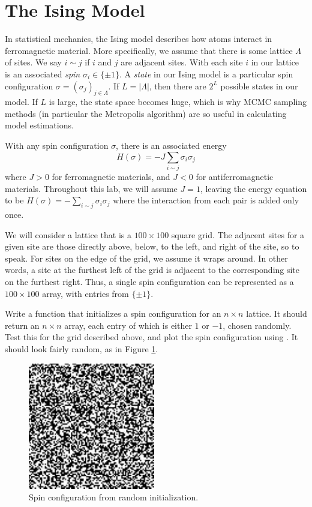 \section*{The Ising Model}
In statistical mechanics, the Ising model describes how atoms interact in ferromagnetic material. More specifically, we assume that there is some lattice $\Lambda$ of sites. We say $i \sim j$ if $i$ and $j$ are adjacent sites. With each site $i$ in our lattice is an associated \emph{spin} $\sigma_{i} \in \{\pm 1\}$. A \emph{state} in our Ising model is a particular spin configuration $\sigma = (\sigma_{j})_{j \in \Lambda}$. If $L = |\Lambda|$, then there are $2^{L}$ possible states in our model. If $L$ is large, the state space becomes huge, which is why MCMC sampling methods (in particular the Metropolis algorithm) are so useful in calculating model estimations.

With any spin configuration $\sigma$, there is an associated energy
\[
H(\sigma) = -J \sum_{i \sim j} \sigma_{i} \sigma_{j}
\]
 where $J > 0$ for ferromagnetic materials, and $J < 0$ for antiferromagnetic materials. Throughout this lab, we will assume $J = 1$, leaving the energy equation to be $H(\sigma) = -\sum_{i \sim j} \sigma_{i}\sigma_{j}$ where the interaction from each pair is added only once.

We will consider a lattice that is a $100 \times 100$ square grid. The adjacent sites for a given site are those directly above, below, to the left, and right of the site, so to speak. For sites on the edge of the grid, we assume it wraps around. In other words, a site at the furthest left of the grid is adjacent to the corresponding site on the furthest right. Thus, a single spin configuration can be represented as a $100 \times 100$ array, with entries from $\{\pm 1\}$.

\begin{problem}
Write a function that initializes a spin configuration for an $n \times n$ lattice. It should return an $n \times n$ array, each entry of which is either $1$ or $-1$, chosen randomly. Test this for the grid described above, and plot the spin configuration using . It should look fairly random, as in Figure \ref{fig:random_spin}.
\end{problem}

\begin{figure}
\centering
\includegraphics[width=.5\textwidth]{init.pdf}
\caption{Spin configuration from random initialization.}
\label{fig:random_spin}
\end{figure}

